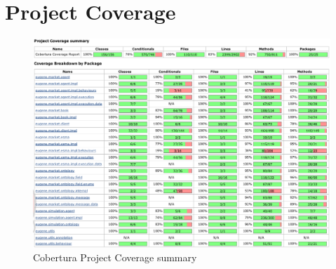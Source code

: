 \chapter{Project Coverage}
\label{Appendix/Project-Coverage}

\begin{figure}[h]
\centerline{\includegraphics[scale=0.5]{Appendix/Coverage.png}}
\caption{Cobertura Project Coverage summary}
\end{figure}

